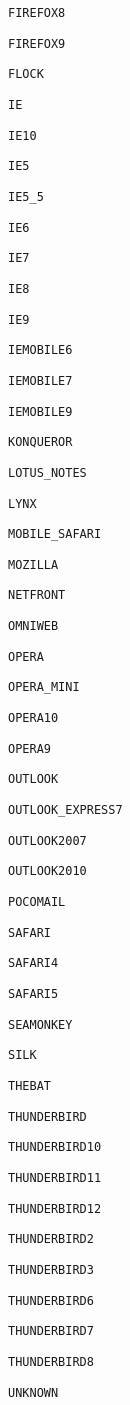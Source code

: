 \documentclass[11pt,a4paper,titlepage]{article}
\begin{document}
\begin{multicols}{4}
    \small \texttt{FIREFOX8}

    \small \texttt{FIREFOX9}

    \small \texttt{FLOCK}

    \small \texttt{IE}

    \small \texttt{IE10}

    \small \texttt{IE5}

    \small \texttt{IE5\_5}

    \small \texttt{IE6}

    \small \texttt{IE7}

    \small \texttt{IE8}

    \small \texttt{IE9}

    \small \texttt{IEMOBILE6}

    \small \texttt{IEMOBILE7}

    \small \texttt{IEMOBILE9}

    \small \texttt{KONQUEROR}

    \small \texttt{LOTUS\_NOTES}

    \small \texttt{LYNX}

    \small \texttt{MOBILE\_SAFARI}

    \small \texttt{MOZILLA}

    \small \texttt{NETFRONT}

    \small \texttt{OMNIWEB}

    \small \texttt{OPERA}

    \small \texttt{OPERA\_MINI}

    \small \texttt{OPERA10}

    \small \texttt{OPERA9}

    \small \texttt{OUTLOOK}

    \small \texttt{OUTLOOK\_EXPRESS7}

    \small \texttt{OUTLOOK2007}

    \small \texttt{OUTLOOK2010}

    \small \texttt{POCOMAIL}

    \small \texttt{SAFARI}

    \small \texttt{SAFARI4}

    \small \texttt{SAFARI5}

    \small \texttt{SEAMONKEY}

    \small \texttt{SILK}

    \small \texttt{THEBAT}

    \small \texttt{THUNDERBIRD}

    \small \texttt{THUNDERBIRD10}

    \small \texttt{THUNDERBIRD11}

    \small \texttt{THUNDERBIRD12}

    \small \texttt{THUNDERBIRD2}

    \small \texttt{THUNDERBIRD3}

    \small \texttt{THUNDERBIRD6}

    \small \texttt{THUNDERBIRD7}

    \small \texttt{THUNDERBIRD8}

    \small \texttt{UNKNOWN}

\end{multicols}
\end{document}
